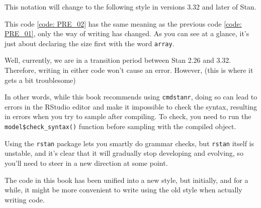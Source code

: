\documentclass{ltjsbook}
\begin{document}
This notation will change to the following style in versions 3.32 and later of Stan.

This code \ref{code: PRE_02} has the same meaning as the previous code \ref{code: PRE_01}, only the way of writing has changed. As you can see at a glance, it's just about declaring the size first with the word \verb|array|.

Well, currently, we are in a transition period between Stan 2.26 and 3.32. Therefore, writing in either code won't cause an error. However, (this is where it gets a bit troublesome)



In other words, while this book recommends using \verb|cmdstanr|, doing so can lead to errors in the RStudio editor and make it impossible to check the syntax, resulting in errors when you try to sample after compiling. To check, you need to run the \verb|model$check_syntax()| function before sampling with the compiled object.

Using the \verb|rstan| package lets you smartly do grammar checks, but \verb|rstan| itself is unstable, and it's clear that it will gradually stop developing and evolving, so you'll need to steer in a new direction at some point.

The code in this book has been unified into a new style, but initially, and for a while, it might be more convenient to write using the old style when actually writing code.
\end{document}
